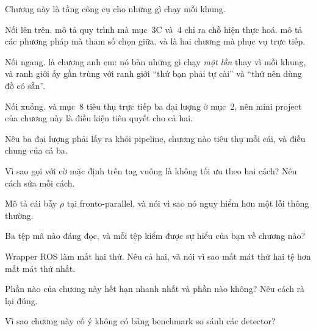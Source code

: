 \documentclass[../../marker.tex]{subfiles}
\begin{document}
Chương này là tầng công cụ cho những gì chạy mỗi khung.

Nối lên trên.  mô tả quy trình mà mục~3C và~4 chỉ ra chỗ hiện thực hoá.  mô tả các phương pháp mà tham số  chọn giữa.  và  là hai chương mà  phục vụ trực tiếp.

Nối ngang.  là chương anh em: nó bàn những gì chạy \emph{một lần} thay vì mỗi khung, và ranh giới ấy gần trùng với ranh giới ``thứ bạn phải tự cài'' và ``thứ nên dùng đồ có sẵn''.

Nối xuống.  và  mục~8 tiêu thụ trực tiếp ba đại lượng ở mục~2, nên mini project của chương này là điều kiện tiên quyết cho cả hai.

\begin{tukiem}
\item Nêu ba đại lượng phải lấy ra khỏi pipeline, chương nào tiêu thụ mỗi cái, và điều chung của cả ba.
\item Vì sao gọi  với cờ mặc định trên tag vuông là không tối ưu theo hai cách? Nêu cách sửa mỗi cách.
\item Mô tả cái bẫy \(\rho\) tại fronto-parallel, và nói vì sao nó nguy hiểm hơn một lỗi thông thường.
\item Ba tệp mã nào đáng đọc, và mỗi tệp kiểm được sự hiểu của bạn về chương nào?
\item Wrapper ROS làm mất hai thứ. Nêu cả hai, và nói vì sao mất mát thứ hai tệ hơn mất mát thứ nhất.
\item Phần nào của chương này hết hạn nhanh nhất và phần nào không? Nêu cách rà lại đúng.
\item Vì sao chương này cố ý không có bảng benchmark so sánh các detector?
\end{tukiem}
\ifSubfilesClassLoaded{\printbibliography[title={Nguồn}]}{}
\end{document}

